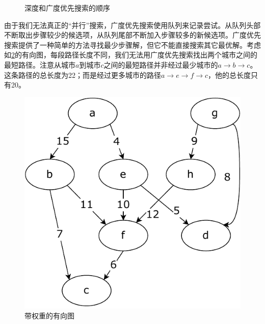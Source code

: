 \documentclass[b5paper]{ctexart}
\begin{document}
\begin{figure}[htbp]
 \centering
 \caption{深度和广度优先搜索的顺序}
 \label{fig:dfs-bfs-tree}
\end{figure}

由于我们无法真正的“并行”搜索，广度优先搜索使用队列来记录尝试。从队列头部不断取出步骤较少的候选项，从队列尾部不断加入步骤较多的新候选项。广度优先搜索提供了一种简单的方法寻找最少步骤解，但它不能直接搜索其它最优解。考虑如\cref{fig:weighted-dag}的有向图，每段路径长度不同，我们无法用广度优先搜索找出两个城市之间的最短路径。注意从城市$a$到城市$c$之间的最短路径并非经过最少城市的$a \to b \to c$。这条路径的总长度为22；而是经过更多城市的路径$a \to e \to f \to c$，他的总长度只有20。

\begin{figure}[htbp]
 \centering
 \includegraphics[scale=0.5]{img/weighted-dag}
 \caption{带权重的有向图}
 \label{fig:weighted-dag}
\end{figure}

\begin{Exercise}
\end{Exercise}
\end{document}
